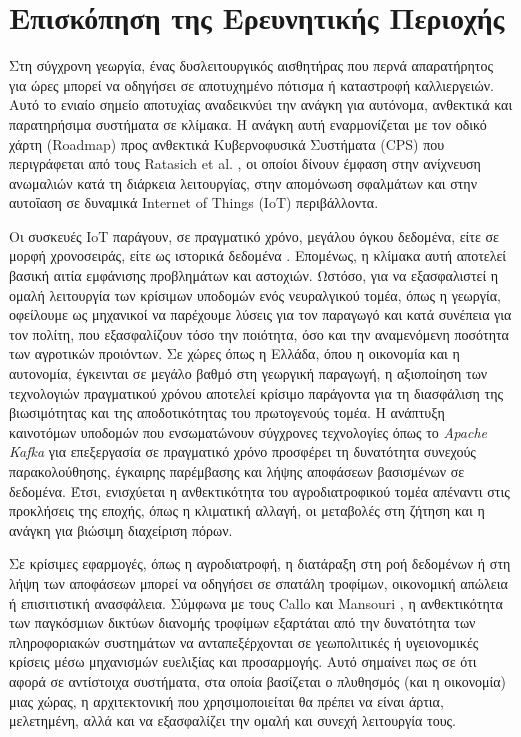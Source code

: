 \chapter{Επισκόπηση της Ερευνητικής Περιοχής}

Στη σύγχρονη γεωργία, ένας δυσλειτουργικός αισθητήρας που περνά απαρατήρητος για ώρες μπορεί να οδηγήσει σε αποτυχημένο πότισμα ή καταστροφή καλλιεργειών. Αυτό το ενιαίο σημείο αποτυχίας αναδεικνύει την ανάγκη για αυτόνομα, ανθεκτικά και παρατηρήσιμα συστήματα σε κλίμακα. Η ανάγκη αυτή εναρμονίζεται με τον οδικό χάρτη (Roadmap) προς ανθεκτικά Κυβερνοφυσικά Συστήματα (CPS) που περιγράφεται από τους Ratasich et al. \cite{iotcps}, οι οποίοι δίνουν έμφαση στην ανίχνευση ανωμαλιών κατά τη διάρκεια λειτουργίας, στην απομόνωση σφαλμάτων και στην αυτοΐαση σε δυναμικά Internet of Things (IoT) περιβάλλοντα.

Οι συσκευές IoT παράγουν, σε πραγματικό χρόνο, μεγάλου όγκου δεδομένα, είτε σε μορφή χρονοσειράς, είτε ως ιστορικά δεδομένα \cite{rtiotevents}. Επομένως, η κλίμακα αυτή αποτελεί βασική αιτία εμφάνισης προβλημάτων και αστοχιών. Ωστόσο, για να εξασφαλιστεί η ομαλή λειτουργία των κρίσιμων υποδομών ενός νευραλγικού τομέα, όπως η γεωργία, οφείλουμε ως μηχανικοί να παρέχουμε λύσεις για τον παραγωγό και κατά συνέπεια για τον πολίτη, που εξασφαλίζουν τόσο την ποιότητα, όσο και την αναμενόμενη ποσότητα των αγροτικών προιόντων. Σε χώρες όπως η Ελλάδα, όπου η οικονομία και η αυτονομία, έγκεινται σε μεγάλο βαθμό στη γεωργική παραγωγή, η αξιοποίηση των τεχνολογιών πραγματικού χρόνου αποτελεί κρίσιμο παράγοντα για τη διασφάλιση της βιωσιμότητας και της αποδοτικότητας του πρωτογενούς τομέα. Η ανάπτυξη καινοτόμων υποδομών που ενσωματώνουν σύγχρονες τεχνολογίες όπως το \textit{Apache Kafka} για επεξεργασία σε πραγματικό χρόνο προσφέρει τη δυνατότητα συνεχούς παρακολούθησης, έγκαιρης παρέμβασης και λήψης αποφάσεων βασισμένων σε δεδομένα. Έτσι, ενισχύεται η ανθεκτικότητα του αγροδιατροφικού τομέα απέναντι στις προκλήσεις της εποχής, όπως η κλιματική αλλαγή, οι μεταβολές στη ζήτηση και η ανάγκη για βιώσιμη διαχείριση πόρων.

Σε κρίσιμες εφαρμογές, όπως η αγροδιατροφή, η διατάραξη στη ροή δεδομένων ή στη λήψη των αποφάσεων μπορεί να οδηγήσει σε σπατάλη τροφίμων, οικονομική απώλεια ή επισιτιστική ανασφάλεια. Σύμφωνα με τους Callo και Mansouri \cite{foodsec}, η ανθεκτικότητα των παγκόσμιων δικτύων διανομής τροφίμων εξαρτάται από την δυνατότητα των πληροφοριακών συστημάτων να ανταπεξέρχονται σε γεωπολιτικές ή υγειονομικές κρίσεις μέσω μηχανισμών ευελιξίας και προσαρμογής. Αυτό σημαίνει πως σε ότι αφορά σε αντίστοιχα συστήματα, στα οποία βασίζεται ο πλυθησμός (και η οικονομία) μιας χώρας, η αρχιτεκτονική που χρησιμοποιείται θα πρέπει να είναι άρτια, μελετημένη, αλλά και να εξασφαλίζει την ομαλή και συνεχή λειτουργία τους.

